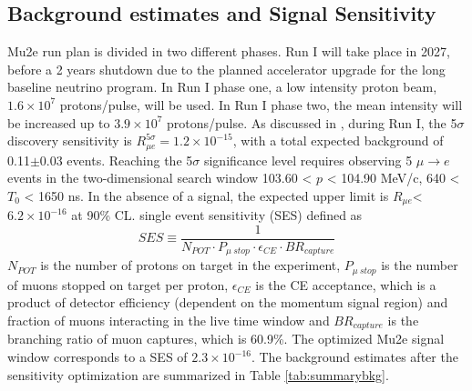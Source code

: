 \subsection{Background estimates and Signal Sensitivity}
Mu2e run plan is divided in two different phases. Run I 
will take place in 2027, before a 2 years shutdown due to the 
planned accelerator upgrade for the long baseline neutrino 
program. In Run I phase one, a low intensity proton beam, 
$1.6 \times 10^7$ protons/pulse, will be used. In Run I 
phase two, the mean intensity will be increased up to $3.9 \times 10^7$ 
protons/pulse. As discussed in \cite{universe9010054}, during Run I, the 5$\sigma$ discovery sensitivity is 
$R_{\mu e}^{5 \sigma} = 1.2 \times 10^{-15}$, with a 
total expected background of 0.11$\pm$0.03 events. 
Reaching the 5$\sigma$ significance level requires 
observing 5 $\mu\rightarrow e$ events in the two-dimensional search window 
103.60 < $p$ < 104.90 MeV/c, 640 < $T_0$ < 1650 ns. In the 
absence of a signal, the expected upper limit is $R_{\mu e}$<$6.2 \times 10^{-16}$
at 90\% CL. 
 single event sensitivity (SES) \del{,} defined as
\begin{equation}
    SES \equiv \frac{1}{N_{POT} \cdot P_{\mu \ stop} \cdot \epsilon_{CE} \cdot BR_{capture}}
\end{equation} 
 $N_{POT}$ is the number of protons on target in the experiment, 
$P_{\mu \ stop}$ is the number of muons stopped on target per 
proton, $\epsilon_{CE}$ is the CE acceptance, which is a product 
of detector efficiency (dependent on the momentum signal region) 
and fraction of muons interacting in the live time window and 
$BR_{capture}$ is the branching ratio of muon captures, which 
is 60.9\%. The optimized Mu2e signal window corresponds to a 
SES of $2.3 \times 10^{-16}$. The background estimates after 
the sensitivity optimization are summarized in Table \ref{tab:summarybkg}.

